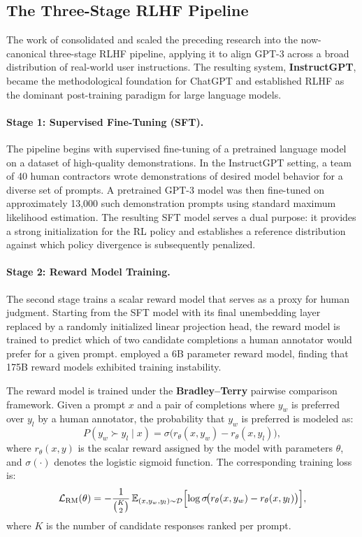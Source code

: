 \documentclass[12pt,a4paper]{report}
\begin{document}
\subsection{The Three-Stage RLHF Pipeline}

The work of \cite{ouyang2022instructgpt} consolidated and scaled the preceding research into the now-canonical three-stage RLHF pipeline, applying it to align GPT-3 across a broad distribution of real-world user instructions. The resulting system, \textbf{InstructGPT}, became the methodological foundation for ChatGPT and established RLHF as the dominant post-training paradigm for large language models.

\paragraph{Stage 1: Supervised Fine-Tuning (SFT).}
The pipeline begins with supervised fine-tuning of a pretrained language model on a dataset of high-quality demonstrations. In the InstructGPT setting, a team of 40 human contractors wrote demonstrations of desired model behavior for a diverse set of prompts. A pretrained GPT-3 model was then fine-tuned on approximately 13,000 such demonstration prompts using standard maximum likelihood estimation. The resulting SFT model serves a dual purpose: it provides a strong initialization for the RL policy and establishes a reference distribution against which policy divergence is subsequently penalized.

\paragraph{Stage 2: Reward Model Training.}
The second stage trains a scalar reward model that serves as a proxy for human judgment. Starting from the SFT model with its final unembedding layer replaced by a randomly initialized linear projection head, the reward model is trained to predict which of two candidate completions a human annotator would prefer for a given prompt. \cite{ouyang2022instructgpt} employed a 6B parameter reward model, finding that 175B reward models exhibited training instability.

The reward model is trained under the \textbf{Bradley--Terry} pairwise comparison framework. Given a prompt $x$ and a pair of completions where $y_w$ is preferred over $y_l$ by a human annotator, the probability that $y_w$ is preferred is modeled as:
\begin{equation}
    P(y_w \succ y_l \mid x) = \sigma\!\bigl(r_\theta(x, y_w) - r_\theta(x, y_l)\bigr),
\end{equation}
where $r_\theta(x, y)$ is the scalar reward assigned by the model with parameters $\theta$, and $\sigma(\cdot)$ denotes the logistic sigmoid function. The corresponding training loss is:
\begin{equation}
    \mathcal{L}_{\text{RM}}(\theta) = -\frac{1}{\binom{K}{2}} \, \mathbb{E}_{(x, y_w, y_l) \sim \mathcal{D}} \Bigl[\log \sigma\!\bigl(r_\theta(x, y_w) - r_\theta(x, y_l)\bigr)\Bigr],
    \label{eq:rm_loss}
\end{equation}
where $K$ is the number of candidate responses ranked per prompt.
\end{document}
